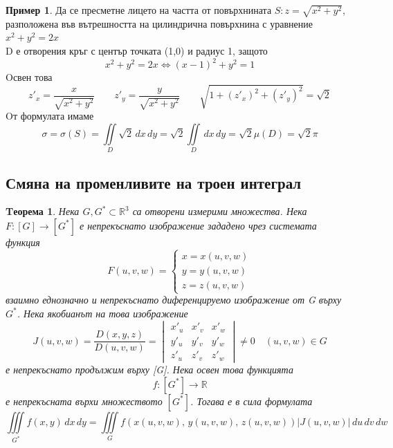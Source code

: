 \documentclass[a4paper,fleqn,12pt]{article}
\newtheorem{theorem}{Tеорема}[subsection]
\theoremstyle{definition}
\newtheorem{example}{Пример}[subsection]
\begin{document}
\begin{example}
Да се пресметне лицето на частта от повърхнината $S: z = \sqrt{x^2 + y^2}$, разположена във вътрешността на цилиндрична повърхнина с уравнение $x^2 + y^2 = 2x$ \\
D е отворения кръг с център точката (1,0) и радиус 1, защото 
$$x^2 + y^2 = 2x \Leftrightarrow (x-1)^2 + y^2 = 1$$
Oсвен това
$$z'_x = \frac{x}{\sqrt{x^2 + y^2}} \qquad z'_y = \frac{y}{\sqrt{x^2 + y^2}} \qquad \sqrt{1 + (z'_x)^2 + (z'_y)^2} = \sqrt{2}$$
Oт формулата имаме
$$\sigma = \sigma(S) = \iint\limits_D \sqrt{2}\, dx \, dy =  \sqrt{2} \iint\limits_D \, dx \, dy = \sqrt{2} \mu(D) = \sqrt{2} \pi $$
\end{example}

\subsection{Смяна на променливите на троен интеграл}

\begin{theorem}
Нека $G,G^* \subset \mathbb{R}^3$ са отворени измерими множества. Нека $F: [G] \to [G^*]$ е непрекъснато изображение зададено чрез системата функция
$$F(u,v,w) = \begin{cases} x = x(u,v,w) \\ y = y(u,v,w) \\ z = z(u,v,w)\end{cases}$$
взаимно еднозначно и непрекъснато диференцируемо изображение от G върху $G^*$. Нека якобианът на това изображение
$$J(u,v,w) = \frac{D(x,y,z)}{D (u,v,w)} = \begin{vmatrix} x'_u & x'_v & x'_w \\  y'_u & y'_v & y'_w \\ z'_u & z'_v & z'_w \end{vmatrix} \neq 0 \quad (u,v,w) \in G$$
е непрекъснато продължим върху [G]. Нека освен това функцията 
$$f: [G^*] \to \mathbb{R}$$
е непрекъсната върхи множеството $[G^*]$. Тогава е в сила формулата
$$\iiint\limits_{G^*} f(x,y) \, dx \, dy = \iiint\limits_{G} f(x(u,v,w),\,y(u,v,w),\,z(u,v,w)) |J(u,v,w) | \, du \, dv \, dw$$
\end{theorem}
\end{document}
